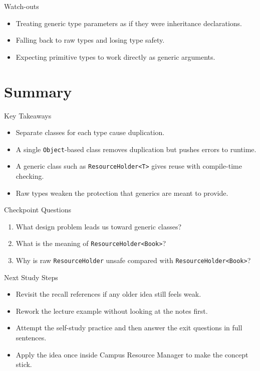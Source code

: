\documentclass{beamer}
\begin{document}
\begin{frame}{Watch-outs}
\begin{itemize}[<+->]
  \item Treating generic type parameters as if they were inheritance declarations.
  \item Falling back to raw types and losing type safety.
  \item Expecting primitive types to work directly as generic arguments.
\end{itemize}
  \slidesources{\OOPSUnitIVSources}
\end{frame}

\section{Summary}
\label{sec:summary}

\begin{frame}{Key Takeaways}
  \begin{itemize}[<+->]
    \item Separate classes for each type cause duplication.
    \item A single \texttt{Object}-based class removes duplication but pushes errors to runtime.
    \item A generic class such as \texttt{ResourceHolder<T>} gives reuse with compile-time checking.
    \item Raw types weaken the protection that generics are meant to provide.
  \end{itemize}
  \slidesources{\OOPSUnitIVSources}
\end{frame}

\begin{frame}{Checkpoint Questions}
  \begin{enumerate}[<+->]
    \item What design problem leads us toward generic classes?
    \item What is the meaning of \texttt{ResourceHolder<Book>}?
    \item Why is raw \texttt{ResourceHolder} unsafe compared with \texttt{ResourceHolder<Book>}?
  \end{enumerate}
  \slidesources{\OOPSUnitIVSources}
\end{frame}

\begin{frame}{Next Study Steps}
\begin{itemize}[<+->]
  \item Revisit the recall references if any older idea still feels weak.
  \item Rework the lecture example without looking at the notes first.
  \item Attempt the self-study practice and then answer the exit questions in full sentences.
  \item Apply the idea once inside Campus Resource Manager to make the concept stick.
\end{itemize}
  \slidesources{\OOPSUnitIVSources}
\end{frame}
\end{document}

